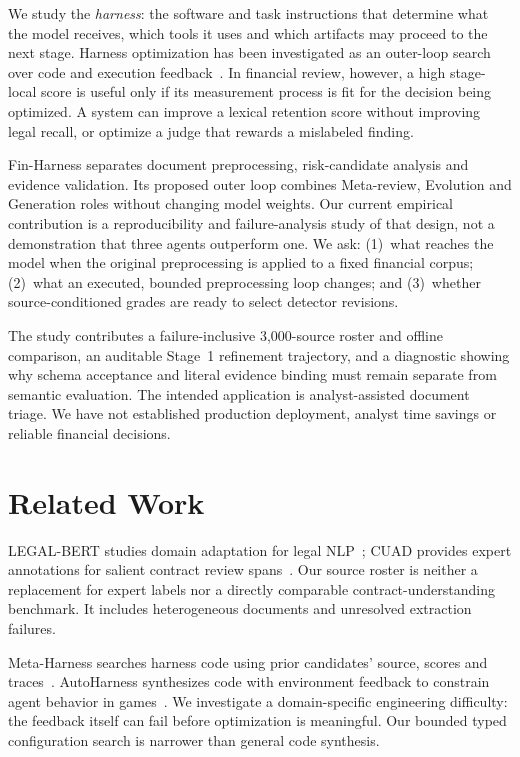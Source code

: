 \documentclass[11pt]{article}
\begin{document}
We study the \emph{harness}: the software and task instructions that determine
what the model receives, which tools it uses and which artifacts may proceed
to the next stage. Harness optimization has been investigated as an outer-loop
search over code and execution feedback~\citep{lee2026metaharness,
lou2026autoharnessimprovingllmagentsimprovingllmagents}. In financial review,
however, a high stage-local score is useful only if its measurement process
is fit for the decision being optimized. A system can improve a lexical
retention score without improving legal recall, or optimize a judge that
rewards a mislabeled finding.

Fin-Harness separates document preprocessing, risk-candidate analysis and
evidence validation. Its proposed outer loop combines Meta-review,
Evolution and Generation roles without changing model weights. Our current
empirical contribution is a reproducibility and failure-analysis study of
that design, not a demonstration that three agents outperform one.
We ask: (1)~what reaches the model when the original preprocessing is
applied to a fixed financial corpus; (2)~what an executed, bounded
preprocessing loop changes; and (3)~whether source-conditioned grades are
ready to select detector revisions.

The study contributes a failure-inclusive 3,000-source roster and offline
comparison, an auditable Stage~1 refinement trajectory, and a diagnostic
showing why schema acceptance and literal evidence binding must remain
separate from semantic evaluation. The intended application is
analyst-assisted document triage. We have not established production
deployment, analyst time savings or reliable financial decisions.

\section{Related Work}
LEGAL-BERT studies domain adaptation for legal NLP~\citep{chalkidis-etal-2020-legalbert};
CUAD provides expert annotations for salient contract review
spans~\citep{cuad}. Our source roster is neither a replacement for expert
labels nor a directly comparable contract-understanding benchmark.
It includes heterogeneous documents and unresolved extraction failures.

Meta-Harness searches harness code using prior candidates' source, scores
and traces~\citep{lee2026metaharness}. AutoHarness synthesizes code with
environment feedback to constrain agent behavior in
games~\citep{lou2026autoharnessimprovingllmagentsimprovingllmagents}.
We investigate a domain-specific engineering difficulty: the feedback
itself can fail before optimization is meaningful. Our bounded typed
configuration search is narrower than general code synthesis.
\end{document}
